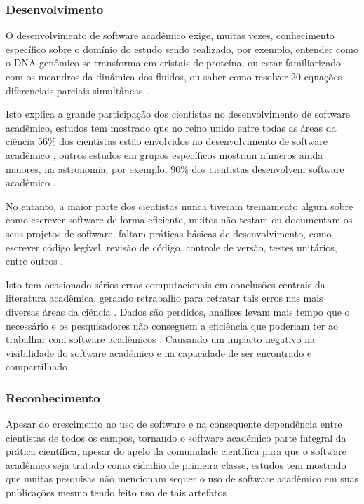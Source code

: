 \subsubsection{Desenvolvimento}

O desenvolvimento de software acadêmico exige, muitas vezes, conhecimento
específico sobre o domínio do estudo sendo realizado,
por exemplo, entender como o DNA genômico
se transforma em cristais de proteína, ou estar familiarizado com os meandros
da dinâmica dos fluidos, ou saber como resolver 20 equações diferenciais
parciais simultâneas \cite{segal2008developing}.

Isto explica a grande participação dos cientistas no desenvolvimento de
software acadêmico, estudos tem mostrado que no reino unido entre todas as
áreas da ciência 56\% dos cientistas estão envolvidos no desenvolvimento de
software acadêmico \cite{hettrick2014uk}, outros estudos em grupos específicos mostram números ainda
maiores, na astronomia, por exemplo, 90\% dos cientistas desenvolvem software
acadêmico \cite{momcheva2015software}.

No entanto, a maior parte dos cientistas nunca tiveram treinamento algum sobre como escrever
software de forma eficiente, muitos não testam ou documentam os seus projetos de
software, faltam práticas básicas de desenvolvimento, como escrever código
legível, revisão de código, controle de versão, testes unitários, entre outros
\cite{wilson2017good}.

Isto tem ocasionado sérios erros computacionais em conclusões centrais da
literatura acadêmica, gerando retrabalho para retratar tais erros nas mais
diversas áreas da ciência \cite{merali2010computational}.
Dados são perdidos, análises levam mais tempo que o necessário e os
pesquisadores não conseguem a eficiência que poderiam ter ao trabalhar com
software acadêmicos \cite{wilson2017good}.
Causando um impacto negativo na visibilidade do software acadêmico e na
capacidade de ser encontrado e compartilhado \cite{howison2013incentives,
katz2014transitive}.

\subsubsection{Reconhecimento}


Apesar do crescimento no uso de software e na consequente dependência entre
cientistas de todos os campos, tornando o software acadêmico parte integral da
prática científica, apesar do apelo da comunidade científica para que o
software acadêmico seja tratado como cidadão de primeira classe, estudos tem
mostrado que muitas pesquisas não mencionam sequer o uso de software acadêmico
em suas publicações mesmo tendo feito uso de tais artefatos
\cite{momcheva2015software} \cite{howison2016software}.

